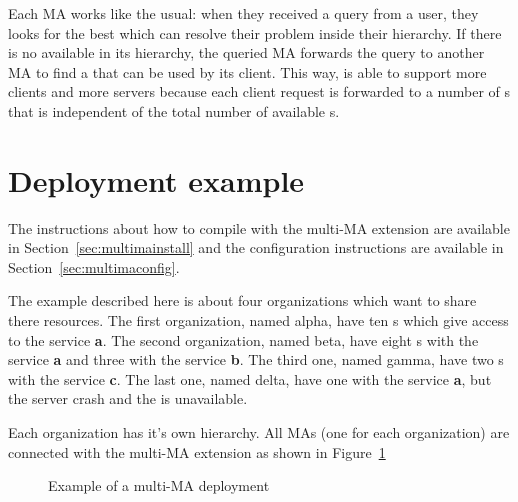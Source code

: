 Each MA works like the usual: when they received a query from a user,
they looks for the best \sed which can resolve their problem inside
their hierarchy. If there is no \sed available in its hierarchy, the
queried MA forwards the query to another MA to find a \sed that can be
used by its client. This way, \diet is able to support more clients
and more servers because each client request is forwarded to a number
of {\sed}s that is independent of the total number of available
{\sed}s.

\section{Deployment example}

The instructions about how to compile \diet with the multi-MA
extension are available in Section~\ref{sec:multimainstall} and the
configuration instructions are available in
Section~\ref{sec:multimaconfig}.

The example described here is about four organizations which want to
share there resources. The first organization, named alpha, have ten
{\sed}s which give access to the service \textbf{a}. The second
organization, named beta, have eight {\sed}s with the service
\textbf{a} and three with the service \textbf{b}. The third one, named
gamma, have two {\sed}s with the service \textbf{c}.  The last one,
named delta, have one \sed with the service \textbf{a}, but the server
crash and the \sed is unavailable.

Each organization has it's own \diet hierarchy. All MAs (one for each
organization) are connected with the multi-MA extension as shown in
Figure~\ref{fig:multima}


\begin{figure}[h]
 \begin{center}
   \label{fig:multima}
  \caption{Example of a multi-MA deployment}
 \end{center}
\end{figure}

